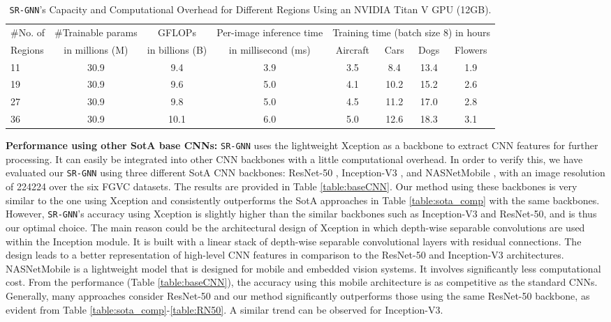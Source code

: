 \documentclass[journal]{IEEEtran}
\begin{document}
\begin{table*}[h]
\begin{center}
\caption{\texttt{SR-GNN}'s Capacity and Computational Overhead for Different Regions Using an NVIDIA Titan V GPU (12GB). }  
\label{table:time}
\begin{tabular}{|l |c |c |c |c |c |c |c|}
 \hline
\#No. of &\#Trainable params &GFLOPs &Per-image inference time  &\multicolumn{4}{|c|}{Training time (batch size 8) in hours}\\
    \cline{5-8}
    Regions &in millions (M) &in billions (B) &in millisecond (ms) &Aircraft &Cars &Dogs &Flowers \\
    \toprule
    11 &30.9 &9.4 &3.9 &3.5 &8.4 &13.4 &1.9\\
    19 &30.9 &9.6 &5.0 &4.1 &10.2 &15.2 &2.6\\
    27 &30.9 &9.8 &5.0 &4.5 &11.2 &17.0 &2.8\\
    36 &30.9 &10.1 &6.0 &5.0 &12.6 &18.3 &3.1\\
   \bottomrule
\end{tabular}
 \end{center}
 \vspace{- 0.5 cm}
\end{table*}

\noindent\textbf{Performance using other SotA base CNNs:} \texttt{SR-GNN} uses the lightweight Xception\cite{chollet2017xception} as a backbone to extract CNN features for further processing. It can easily be integrated into other CNN backbones with a little computational overhead. In order to verify this, we have evaluated our \texttt{SR-GNN} using three different SotA CNN backbones: ResNet-50 \cite{he2016deep}, Inception-V3 \cite{szegedy2016rethinking}, and NASNetMobile \cite{zoph2018learning}, with an image resolution of 224224 over the six FGVC datasets. The results are provided in Table \ref{table:baseCNN}. Our method using these backbones is very similar to the one using Xception and consistently outperforms the SotA approaches in Table \ref{table:sota_comp} with the same backbones. However, \texttt{SR-GNN}'s accuracy using Xception is slightly higher than the similar backbones such as Inception-V3 and ResNet-50, and is thus our optimal choice. The main reason could be the architectural design of Xception in which depth-wise separable convolutions are used within the Inception module. It is built with a linear stack of depth-wise separable convolutional layers with residual connections. The design leads to a better representation of high-level CNN features in comparison to the ResNet-50 and Inception-V3 architectures. NASNetMobile \cite{zoph2018learning} is a lightweight model that is designed for mobile and embedded vision systems. It involves significantly less computational cost. From the performance (Table \ref{table:baseCNN}), the accuracy using this mobile architecture is as competitive as the standard CNNs. Generally, many approaches consider ResNet-50 and our method significantly outperforms those using the same ResNet-50 backbone, as evident from Table \ref{table:sota_comp}-\ref{table:RN50}.  A similar trend can be observed for Inception-V3.
\end{document}
